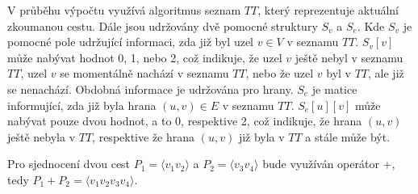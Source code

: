         \vspace*{1em}
        V průběhu výpočtu využívá algoritmus seznam $TT$, který reprezentuje aktuální zkoumanou cestu. Dále jsou udržovány dvě pomocné struktury $S_v$ a $S_e$. Kde $S_v$ je pomocné pole udržující informaci, zda již byl uzel $v \in V$ v seznamu $TT$. $S_v[v]$ může nabývat hodnot 0, 1, nebo 2, což indikuje, že uzel $v$ ještě nebyl v seznamu $TT$, uzel $v$ se momentálně nachází v seznamu $TT$, nebo že uzel $v$ byl v $TT$, ale již se nenachází. Obdobná informace je udržována pro hrany. $S_e$ je matice informující, zda již byla hrana $(u, v) \in E$ v seznamu $TT$. $S_e[u][v]$ může nabývat pouze dvou hodnot, a to 0, respektive 2, což indikuje, že hrana $(u, v)$ ještě nebyla v $TT$, respektive že hrana $(u, v)$ již byla v $TT$ a stále může být.

        Pro sjednocení dvou cest $P_1 = \langle v_1v_2 \rangle$ a $P_2 = \langle v_3v_4 \rangle$ bude využíván operátor $+$, tedy $P_1 + P_2 = \langle v_1v_2v_3v_4 \rangle$.

